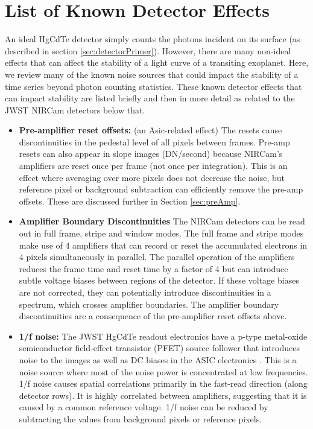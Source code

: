 \documentclass[]{aastex62}
\begin{document}
\section{List of Known Detector Effects}\label{sec:knownEffects}
An ideal HgCdTe detector simply counts the photons incident on its surface (as described in section \ref{sec:detectorPrimer}).
However, there are many non-ideal effects that can affect the stability of a light curve of a transiting exoplanet.
Here, we review many of the known noise sources that could impact the stability of a time series beyond photon counting statistics. These known detector effects that can impact stability are listed briefly and then in more detail as related to the JWST NIRCam detectors below that.

\begin{itemize}[noitemsep]
	\item \textbf{Pre-amplifier reset offsets:} (an Asic-related effect) 
The resets cause discontinuities in the pedestal level of all pixels between frames.
Pre-amp resets can also appear in slope images (DN/second) because NIRCam's amplifiers are reset once per frame (not once per integration).
This is an effect where averaging over more pixels does not decrease the noise, but reference pixel or background subtraction can efficiently remove the pre-amp offsets.
These are discussed further in Section \ref{sec:preAmp}.
	\item \textbf{Amplifier Boundary Discontinuities} The NIRCam detectors can be read out in full frame, stripe and window modes. The full frame and stripe modes make use of 4 amplifiers that can record or reset the accumulated electrons in 4 pixels simultaneously in parallel. The parallel operation of the amplifiers reduces the frame time and reset time by a factor of 4 but can introduce subtle voltage biases between regions of the detector. If these voltage biases are not corrected, they can potentially introduce discontinuities in a spectrum, which crosses amplifier boundaries.
	The amplifier boundary discontinuities are a consequence of the pre-amplifier reset offsets above.
	\item \textbf{1/f noise:} The JWST HgCdTe readout electronics have a p-type metal-oxide semiconductor field-effect transistor (PFET) source follower that introduces noise to the images as well as DC biases in the ASIC electronics \citep{rauscher2011irsSquared}.
	This is a noise source where most of the noise power is concentrated at low frequencies.
	1/f noise causes spatial correlations primarily in the fast-read direction (along detector rows). It is highly correlated between amplifiers, suggesting that it is caused by a common reference voltage. 1/f noise can be reduced by subtracting the values from background pixels or reference pixels.

\end{itemize}
\end{document}
